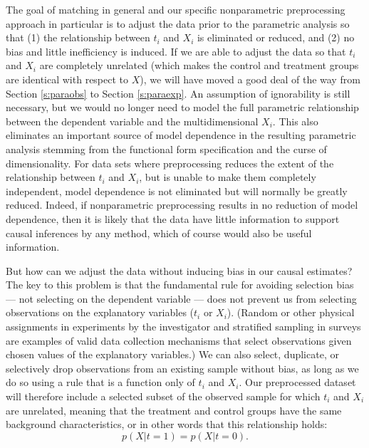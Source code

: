 \documentclass[11pt,titlepage]{article}
\begin{document}
The goal of matching in general and our specific nonparametric
preprocessing approach in particular is to adjust the data prior to
the parametric analysis so that (1) the relationship between $t_i$ and
$X_i$ is eliminated or reduced, and (2) no bias and little
inefficiency is induced.  If we are able to adjust the data so that
$t_i$ and $X_i$ are completely unrelated (which makes the control and
treatment groups are identical with respect to $X$), we will have
moved a good deal of the way from Section \ref{s:paraobs} to Section
\ref{s:paraexp}.  An assumption of ignorability is still necessary,
but we would no longer need to model the full parametric relationship
between the dependent variable and the multidimensional $X_i$.  This
also eliminates an important source of model dependence in the
resulting parametric analysis stemming from the functional form
specification and the curse of dimensionality.  For data sets where
preprocessing reduces the extent of the relationship between $t_i$ and
$X_i$, but is unable to make them completely independent, model
dependence is not eliminated but will normally be greatly reduced.
Indeed, if nonparametric preprocessing results in no reduction of
model dependence, then it is likely that the data have little
information to support causal inferences by any method, which of
course would also be useful information.

But how can we adjust the data without inducing bias in our causal
estimates?  The key to this problem is that the fundamental rule for
avoiding selection bias --- not selecting on the dependent variable
--- does not prevent us from selecting observations on the explanatory
variables ($t_i$ or $X_i$).  (Random or other physical assignments in
experiments by the investigator and stratified sampling in surveys are
examples of valid data collection mechanisms that select observations
given chosen values of the explanatory variables.)  We can also
select, duplicate, or selectively drop observations from an existing
sample without bias, as long as we do so using a rule that is a
function only of $t_i$ and $X_i$.  Our preprocessed dataset will
therefore include a selected subset of the observed sample for which
$t_i$ and $X_i$ are unrelated, meaning that the treatment and control
groups have the same background characteristics, or in other words
that this relationship holds:
\begin{equation}
  \label{balance}
  p(X|t=1) = p(X|t=0).
\end{equation}
\end{document}
